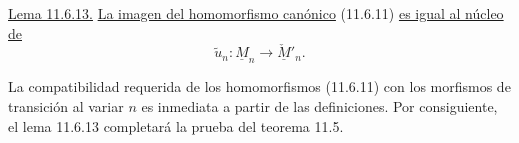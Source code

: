 \medskip
\noindent
\underline{Lema 11.6.13.} \underline{La imagen del homomorfismo
canónico} (11.6.11) \underline{es igual al núcleo de}
\begin{equation*}
\widetilde u_n:\underline M_n\longrightarrow\underline{\check M}'_n.
\end{equation*}

La compatibilidad requerida de los homomorfismos (11.6.11) con los
morfismos de transición al variar $n$ es inmediata a partir de las
definiciones. Por consiguiente, el lema 11.6.13 completará la prueba del
teorema 11.5.
